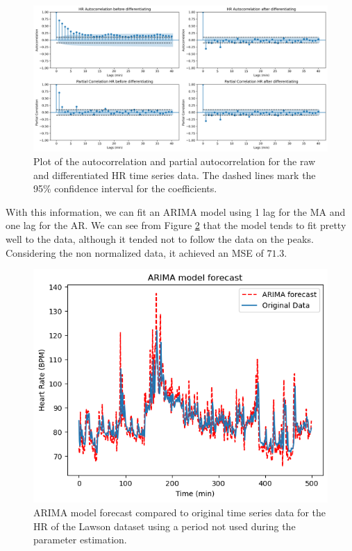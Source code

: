 \documentclass[../main.tex]{subfiles}
\begin{document}
        \begin{figure}[h]
            \begin{center}
            \centering
            \includegraphics[width={\columnwidth}]{images/acf.png}
            \caption{Plot of the autocorrelation and partial autocorrelation for the raw and differentiated HR time series data. The dashed lines mark the 95\% confidence interval for the coefficients.}
            \label{fig:acf}
            \end{center}
        \end{figure}

        With this information, we can fit an ARIMA model using 1 lag for the MA and one lag for the AR. We can see from Figure \ref{fig:arima} that the model tends to fit pretty well to the data, although it tended not to follow the data on the peaks. Considering the non normalized data, it achieved an MSE of $71.3$.
        
        \begin{figure}[h]
            \begin{center}
            \centering
            \includegraphics[width={\columnwidth}]{images/ARIMA.png}
            \caption{ARIMA model forecast compared to original time series data for the HR of the Lawson dataset using a period not used during the parameter estimation.}
            \label{fig:arima}
            \end{center}
        \end{figure}
\end{document}
